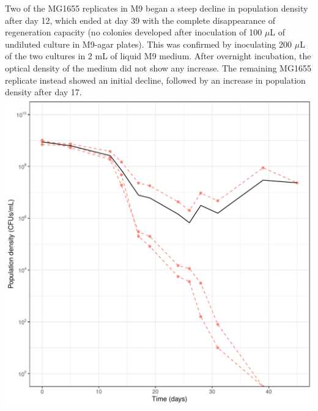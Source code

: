 \documentclass[
    11pt,
    a4paper,
    twoside
]{article} %
\begin{document}
\begin{multicols}{2}
Two of the MG1655 replicates in M9 began a steep decline in population density after day 12, which ended at day 39 with the complete disappearance of regeneration capacity (no colonies developed after inoculation of 100 $\mu$L of undiluted culture in M9-agar plates).
This was confirmed by inoculating 200 $\mu$L of the two cultures in 2 mL of liquid M9 medium.
After overnight incubation, the optical density of the medium did not show any increase.
The remaining MG1655 replicate instead showed an initial decline, followed by an increase in population density after day 17.
\\[2ex]
\includegraphics[width=\columnwidth]{MG1655_M9_plot.pdf}


\end{multicols}
\end{document}
